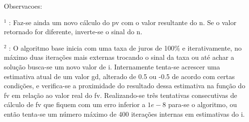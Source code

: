 \documentclass[a4paper,10pt]{article}
\begin{document}
Observacoes: 

$ ^{1} $ : Faz-se ainda um novo cálculo do pv com o valor resultante do n. Se o valor retornado for diferente, inverte-se o sinal do n.

$ ^{2} $ : O algoritmo base inicia com uma taxa de juros de 100\% e iterativamente, no máximo duas iterações mais externas trocando o sinal da taxa ou até achar a solução busca-se um novo valor de i. Internamente tenta-se acrescer uma estimativa atual de um valor gd, alterado de 0.5 ou -0.5 de acordo com certas condições, e verifica-se a proximidade do resultado dessa estimativa na função do fv em relação ao valor real do fv. Realizando-se três tentativas consecutivas de cálculo de fv que fiquem com um erro inferior a $ 1e-8 $ para-se o algoritmo, ou então tenta-se um número máximo de 400 iterações internas em estimativas do i.
\end{document}
